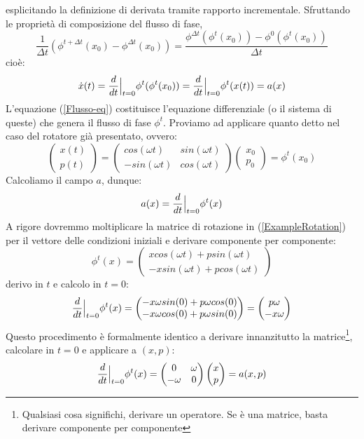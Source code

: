 \documentclass[a4paper,openany]{article}
\begin{document}
	esplicitando la definizione di derivata tramite rapporto incrementale. Sfruttando le proprietà di composizione del flusso di fase,
	$$
	\dfrac{1}{\Delta t}(\phi^{t+\Delta t}(x_{0})-\phi^{\Delta t}(x_{0})) = \dfrac{\phi^{\Delta t}(\phi^{t}(x_{0}))-\phi^{0}(\phi^{t}(x_{0}))}{\Delta t}
	$$
	cioè:
	$$
	\dot{x}(t) = \dfrac{d}{dt}\Bigl|_{t=0} \phi^{t}(\phi^{t}(x_{0})) = \dfrac{d}{dt}\Bigl|_{t=0} \phi^{t}(x(t)) = a(x)
	$$
	L'equazione (\ref{Flusso-eq}) costituisce l'equazione differenziale (o il sistema di queste) che genera il flusso di fase $\phi^{t}$.
	Proviamo ad applicare quanto detto nel caso del rotatore già presentato, ovvero:
	\begin{equation}
		\begin{pmatrix}
			x(t) \\ p(t)
		\end{pmatrix}
		= 
		\begin{pmatrix}
			cos(\omega t) & sin(\omega t)\\
			-sin(\omega t) & cos(\omega t)
		\end{pmatrix}
		\begin{pmatrix}
			x_{0} \\ p_{0}
		\end{pmatrix}
		= \phi^{t} (x_{0})
		\label{ExampleRotation}
	\end{equation}
	Calcoliamo il campo $a$, dunque:
	$$
	a(x) = \dfrac{d}{dt}\Bigl|_{t=0}\phi^{t}(x)
	$$
	A rigore dovremmo moltiplicare la matrice di rotazione in (\ref{ExampleRotation}) per il vettore delle condizioni iniziali e derivare componente per componente:
	$$
	\phi^{t}(x) =
	\begin{pmatrix}
		xcos(\omega t) + psin(\omega t) \\
		-xsin(\omega t) + pcos(\omega t)
	\end{pmatrix}
	$$
	derivo in $t$ e calcolo in $t=0$:
	$$
	\dfrac{d}{dt}\Bigl|_{t=0}\phi^{t}(x) =
	\begin{pmatrix}
		-x\omega sin(0) + p\omega cos(0) \\
		-x\omega cos(0) + p\omega sin(0)
	\end{pmatrix}
	=
	\begin{pmatrix}
		p\omega  \\
		-x\omega
	\end{pmatrix}
	$$
	Questo procedimento è formalmente identico a derivare innanzitutto la matrice\footnote{Qualsiasi cosa significhi, derivare un operatore. Se è una matrice, basta derivare componente per componente}, calcolare in $t=0$ e applicare a $(x,p)$:
	$$
	\dfrac{d}{dt}\Bigl|_{t=0} \phi^{t}(x) =
	\begin{pmatrix}
		0 &  \omega \\
		-\omega & 0
	\end{pmatrix}
	\begin{pmatrix}
		x \\
		p
	\end{pmatrix}
	= a (x,p)
	$$
\end{document}
